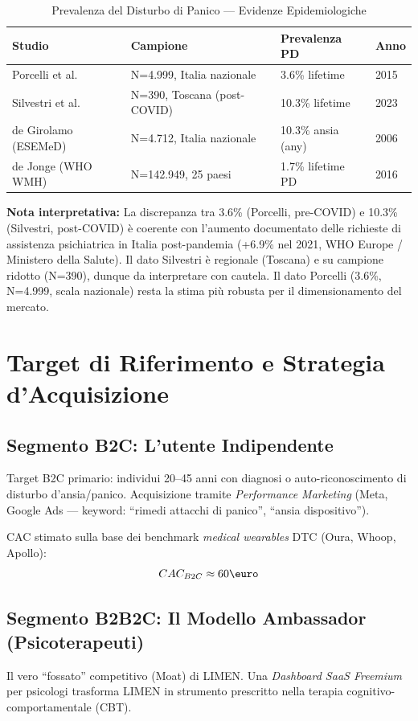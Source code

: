 \documentclass[12pt,a4paper]{article}
\begin{document}
\begin{table}[h!]
    \centering
    \small
    \caption{Prevalenza del Disturbo di Panico --- Evidenze Epidemiologiche}
    \vspace{0.3cm}
    \begin{tabularx}{\textwidth}{@{}l X l l@{}}
        \toprule
        \textbf{Studio} & \textbf{Campione} & \textbf{Prevalenza PD} & \textbf{Anno} \\ \midrule
        Porcelli et al. & N=4.999, Italia nazionale & 3.6\% lifetime & 2015 \\
        Silvestri et al. & N=390, Toscana (post-COVID) & 10.3\% lifetime & 2023 \\
        de Girolamo (ESEMeD) & N=4.712, Italia nazionale & 10.3\% ansia (any) & 2006 \\
        de Jonge (WHO WMH) & N=142.949, 25 paesi & 1.7\% lifetime PD & 2016 \\
        \bottomrule
    \end{tabularx}
\end{table}

\textbf{Nota interpretativa:} La discrepanza tra 3.6\% (Porcelli, pre-COVID) e 10.3\% (Silvestri, post-COVID) è coerente con l'aumento documentato delle richieste di assistenza psichiatrica in Italia post-pandemia (+6.9\% nel 2021, WHO Europe / Ministero della Salute). Il dato Silvestri è regionale (Toscana) e su campione ridotto (N=390), dunque da interpretare con cautela. Il dato Porcelli (3.6\%, N=4.999, scala nazionale) resta la stima più robusta per il dimensionamento del mercato.

\section{Target di Riferimento e Strategia d'Acquisizione}

\subsection{Segmento B2C: L'utente Indipendente}
Target B2C primario: individui 20--45 anni con diagnosi o auto-riconoscimento di disturbo d'ansia/panico. Acquisizione tramite \textit{Performance Marketing} (Meta, Google Ads --- keyword: ``rimedi attacchi di panico'', ``ansia dispositivo'').

CAC stimato sulla base dei benchmark \textit{medical wearables} DTC (Oura, Whoop, Apollo):
$$CAC_{B2C} \approx 60\text{\euro}$$

\subsection{Segmento B2B2C: Il Modello Ambassador (Psicoterapeuti)}
Il vero ``fossato'' competitivo (Moat) di LIMEN. Una \textit{Dashboard SaaS Freemium} per psicologi trasforma LIMEN in strumento prescritto nella terapia cognitivo-comportamentale (CBT).
\end{document}
